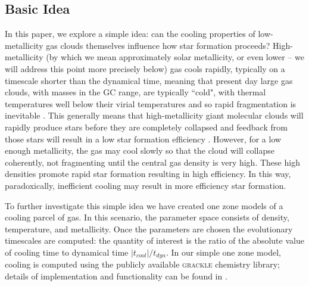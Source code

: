 \documentclass[useAMS,usenatbib]{mn2e}
\begin{document}
%
\subsection{Basic Idea}
\label{sec:basic}

In this paper, we explore a simple idea: can the cooling properties of low-metallicity gas clouds themselves influence how star formation proceeds?  High-metallicity (by which we mean approximately solar metallicity, or even lower -- we will address this point more precisely below) gas cools rapidly, typically on a timescale shorter than the dynamical time, meaning that present day large gas clouds, with masses in the GC range, are typically ``cold", with thermal temperatures well below their virial temperatures and so rapid fragmentation is inevitable \citep{Hoyle1953}.  This generally means that high-metallicity giant molecular clouds will rapidly produce stars before they are completely collapsed and feedback from those stars will result in a low star formation efficiency \citep[e.g.,][]{McKee1989}.  However, for a low enough metallicity, the gas may cool slowly so that the cloud will collapse coherently, not fragmenting until the central gas density is very high.  These high densities promote rapid star formation resulting in high efficiency.  In this way, paradoxically, inefficient cooling may result in more efficiency star formation. 

To further investigate this simple idea we have created one zone models of a cooling parcel of gas. In  this scenario, the parameter space consists of density, temperature, and metallicity. Once the parameters are chosen the evolutionary timescales are computed: the quantity of interest is the ratio of the absolute value of cooling time to dynamical time $|t_{cool}|/t_{dyn}$. In our simple one zone model, cooling is computed using the publicly available \textsc{grackle} chemistry library; details of implementation and functionality can be found
in \cite{Smith2016}.
\end{document}
